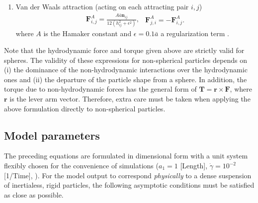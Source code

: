 \begin{enumerate}
\item Van der Waals attraction (acting on each attracting pair $i,j$)
  \begin{subequations}
    \begin{equation} 
      \begin{aligned}
        {\bm F}^A_{i,j} = \frac{A\bar{a} {\bm n}_{ij}}{12(h_{ij}^2+\epsilon^2)}, 
      \end{aligned}
    \end{equation}
    \begin{equation} 
      \begin{aligned}
        {\bm F}^A_{j,i} = -{\bm F}^A_{i,j}.
      \end{aligned}
    \end{equation}
  \end{subequations}
  where $A$ is the Hamaker constant and $\epsilon=0.1\bar{a}$ a regularization term \citep{Singh_attr_prl2019}.

\end{enumerate}

Note that the hydrodynamic force and torque given above are strictly valid for spheres. The validity of these expressions for non-spherical particles depends on (i) the dominance of the non-hydrodynamic interactions over the hydrodynamic ones and (ii) the departure of the particle shape from a sphere. In addition, the torque due to non-hydrodynamic forces has the general form of ${\bm T}= {\bm r} \times {\bm F}$, where ${\bm r}$ is the lever arm vector. Therefore, extra care must be taken when applying the above formulation directly to non-spherical particles.


\subsection{Model parameters}
\label{model param}

The preceding equations are formulated in dimensional form with a unit system flexibly chosen for the convenience of simulations (\eg $a_1=1$ [{\small Length}], $\dot{\gamma}=10^{-2}$ [{\small 1/Time}], \etc). For the model output to correspond \emph{physically} to a dense suspension of inertialess, rigid particles, the following asymptotic conditions must be satisfied as close as possible.

